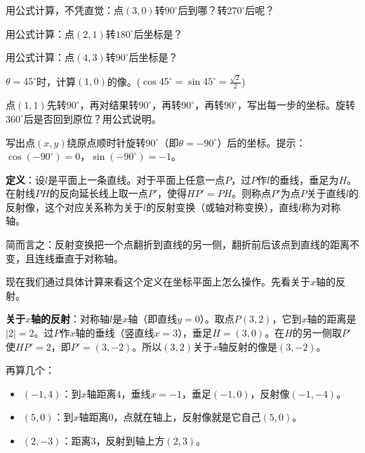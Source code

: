 \begin{exercise}
\item 用公式计算，不凭直觉：点$(3,0)$转$90^\circ$后到哪？转$270^\circ$后呢？
\item 用公式计算：点$(2,1)$转$180^\circ$后坐标是？
\item 用公式计算：点$(4,3)$转$90^\circ$后坐标是？
\item $\theta=45^\circ$时，计算$(1,0)$的像。($\cos45^\circ=\sin45^\circ=\frac{\sqrt2}{2}$)
\item 点$(1,1)$先转$90^\circ$，再对结果转$90^\circ$，再转$90^\circ$，再转$90^\circ$，写出每一步的坐标。旋转$360^\circ$后是否回到原位？用公式说明。
\item 写出点$(x,y)$绕原点顺时针旋转$90^\circ$（即$\theta=-90^\circ$）后的坐标。提示：$\cos(-90^\circ)=0$，$\sin(-90^\circ)=-1$。
\end{exercise}


\textbf{定义}：设$l$是平面上一条直线。对于平面上任意一点$P$，过$P$作$l$的垂线，垂足为$H$。在射线$PH$的反向延长线上取一点$P'$，使得$HP' = PH$。则称点$P'$为点$P$关于直线$l$的反射像，这个对应关系称为关于$l$的反射变换（或轴对称变换），直线$l$称为对称轴。

简而言之：反射变换把一个点翻折到直线的另一侧，翻折前后该点到直线的距离不变，且连线垂直于对称轴。

\begin{center}
\end{center}

现在我们通过具体计算来看这个定义在坐标平面上怎么操作。先看关于$x$轴的反射。

\textbf{关于$x$轴的反射}：对称轴$l$是$x$轴（即直线$y=0$）。取点$P(3,2)$，它到$x$轴的距离是$|2|=2$。过$P$作$x$轴的垂线（竖直线$x=3$），垂足$H=(3,0)$。在$H$的另一侧取$P'$使$HP'=2$，即$P'=(3,-2)$。所以$(3,2)$关于$x$轴反射的像是$(3,-2)$。

再算几个：
\begin{itemize}
\item $(-1,4)$：到$x$轴距离$4$，垂线$x=-1$，垂足$(-1,0)$，反射像$(-1,-4)$。
\item $(5,0)$：到$x$轴距离$0$，点就在轴上，反射像就是它自己$(5,0)$。
\item $(2,-3)$：距离$3$，反射到轴上方$(2,3)$。
\end{itemize}


